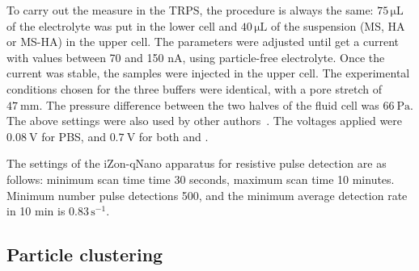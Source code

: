 \documentclass[journal=langd5,manuscript=article]{achemso}
\begin{document}
To carry out the measure in the TRPS, the procedure is always the same: $\mathrm{75 \,\mu L}$ of the electrolyte was put in the lower cell and $\mathrm{40 \,\mu L}$  of the suspension (MS, HA or MS-HA) in the upper cell. The parameters were adjusted until get a current with values between 70 and 150 nA, using particle-free electrolyte. Once the current was stable, the samples were injected in the upper cell. The experimental conditions chosen for the three buffers  were identical, with a pore stretch of $47~\mathrm{mm}$. The pressure difference between the two halves of the fluid cell was $66~\mathrm{Pa}$. The above settings were also used by other authors~\cite{Weatherall2016}. The voltages applied were  $0.08~\mathrm{V}$ for PBS, and  $0.7~\mathrm{V}$ for both  and . 
	



The settings of the iZon-qNano apparatus  for resistive pulse detection are as follows: minimum scan time  time 30 seconds, maximum scan time  10 minutes. Minimum number pulse detections 500, and the minimum average detection  rate in 10 min is  $\mathrm{0.83\, s^{-1}}$. 












\subsection{Particle clustering}
\end{document}
